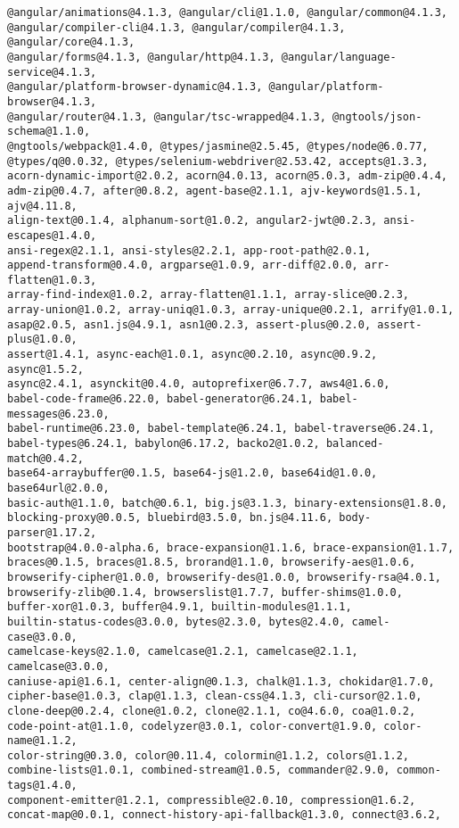\documentclass[a4paper]{article}
\begin{document}
\begin{verbatim}
@angular/animations@4.1.3, @angular/cli@1.1.0, @angular/common@4.1.3,
@angular/compiler-cli@4.1.3, @angular/compiler@4.1.3, @angular/core@4.1.3,
@angular/forms@4.1.3, @angular/http@4.1.3, @angular/language-service@4.1.3,
@angular/platform-browser-dynamic@4.1.3, @angular/platform-browser@4.1.3,
@angular/router@4.1.3, @angular/tsc-wrapped@4.1.3, @ngtools/json-schema@1.1.0,
@ngtools/webpack@1.4.0, @types/jasmine@2.5.45, @types/node@6.0.77,
@types/q@0.0.32, @types/selenium-webdriver@2.53.42, accepts@1.3.3,
acorn-dynamic-import@2.0.2, acorn@4.0.13, acorn@5.0.3, adm-zip@0.4.4,
adm-zip@0.4.7, after@0.8.2, agent-base@2.1.1, ajv-keywords@1.5.1, ajv@4.11.8,
align-text@0.1.4, alphanum-sort@1.0.2, angular2-jwt@0.2.3, ansi-escapes@1.4.0,
ansi-regex@2.1.1, ansi-styles@2.2.1, app-root-path@2.0.1,
append-transform@0.4.0, argparse@1.0.9, arr-diff@2.0.0, arr-flatten@1.0.3,
array-find-index@1.0.2, array-flatten@1.1.1, array-slice@0.2.3,
array-union@1.0.2, array-uniq@1.0.3, array-unique@0.2.1, arrify@1.0.1,
asap@2.0.5, asn1.js@4.9.1, asn1@0.2.3, assert-plus@0.2.0, assert-plus@1.0.0,
assert@1.4.1, async-each@1.0.1, async@0.2.10, async@0.9.2, async@1.5.2,
async@2.4.1, asynckit@0.4.0, autoprefixer@6.7.7, aws4@1.6.0,
babel-code-frame@6.22.0, babel-generator@6.24.1, babel-messages@6.23.0,
babel-runtime@6.23.0, babel-template@6.24.1, babel-traverse@6.24.1,
babel-types@6.24.1, babylon@6.17.2, backo2@1.0.2, balanced-match@0.4.2,
base64-arraybuffer@0.1.5, base64-js@1.2.0, base64id@1.0.0, base64url@2.0.0,
basic-auth@1.1.0, batch@0.6.1, big.js@3.1.3, binary-extensions@1.8.0,
blocking-proxy@0.0.5, bluebird@3.5.0, bn.js@4.11.6, body-parser@1.17.2,
bootstrap@4.0.0-alpha.6, brace-expansion@1.1.6, brace-expansion@1.1.7,
braces@0.1.5, braces@1.8.5, brorand@1.1.0, browserify-aes@1.0.6,
browserify-cipher@1.0.0, browserify-des@1.0.0, browserify-rsa@4.0.1,
browserify-zlib@0.1.4, browserslist@1.7.7, buffer-shims@1.0.0,
buffer-xor@1.0.3, buffer@4.9.1, builtin-modules@1.1.1,
builtin-status-codes@3.0.0, bytes@2.3.0, bytes@2.4.0, camel-case@3.0.0,
camelcase-keys@2.1.0, camelcase@1.2.1, camelcase@2.1.1, camelcase@3.0.0,
caniuse-api@1.6.1, center-align@0.1.3, chalk@1.1.3, chokidar@1.7.0,
cipher-base@1.0.3, clap@1.1.3, clean-css@4.1.3, cli-cursor@2.1.0,
clone-deep@0.2.4, clone@1.0.2, clone@2.1.1, co@4.6.0, coa@1.0.2,
code-point-at@1.1.0, codelyzer@3.0.1, color-convert@1.9.0, color-name@1.1.2,
color-string@0.3.0, color@0.11.4, colormin@1.1.2, colors@1.1.2,
combine-lists@1.0.1, combined-stream@1.0.5, commander@2.9.0, common-tags@1.4.0,
component-emitter@1.2.1, compressible@2.0.10, compression@1.6.2,
concat-map@0.0.1, connect-history-api-fallback@1.3.0, connect@3.6.2,

\end{verbatim}
\end{document}
